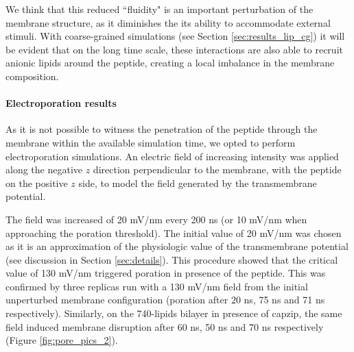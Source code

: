 We think that this reduced ``fluidity" is an important perturbation of the membrane structure, as it diminishes the its ability to accommodate external stimuli. With coarse-grained simulations (see Section \ref{sec:results_lip_cg}) it will be evident that on the long time scale, these interactions are also able to recruit anionic lipids around the peptide, creating a local imbalance in the membrane composition.


\paragraph{Electroporation results}
As it is not possible to witness the penetration of the peptide through the membrane within the available simulation time, we opted to perform electroporation simulations.
%
An electric field of increasing intensity was applied along the negative $z$ direction perpendicular to the membrane, with the peptide on the positive $z$ side, to model the field generated by the transmembrane potential.

The field was increased of 20 mV/nm every 200 ns (or 10 mV/nm when approaching the poration threshold). The initial value of 20 mV/nm was chosen as it is an approximation of the physiologic value of the transmembrane potential (see discussion in Section \ref{sec:details}). This procedure showed that the critical value of 130 mV/nm triggered poration in presence of the peptide. 
%
This was confirmed by three replicas run with a 130 mV/nm field from the initial unperturbed membrane configuration (poration after 20 ns, 75 ns and 71 ns respectively).
%
Similarly, on the 740-lipids bilayer in presence of capzip, the same field induced membrane disruption after 60 ns, 50 ns and 70 ns respectively (Figure \ref{fig:pore_pics_2}).

